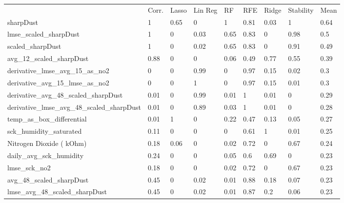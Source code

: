 \begin{table}[]
\centering
\small
\begin{tabular}{lllllllll}
\\
\\
\toprule
     & Corr. & Lasso & Lin Reg & RF   & RFE  & Ridge & Stability & Mean \\
\midrule
sharpDust                                    & 1     & 0.65       & 0    & 1    & 0.81  & 0.03      & 1    & 0.64 \\
lmse\_scaled\_sharpDust                      & 1     & 0          & 0.03 & 0.65 & 0.83  & 0         & 0.98 & 0.5  \\
scaled\_sharpDust                            & 1     & 0          & 0.02 & 0.65 & 0.83  & 0         & 0.91 & 0.49 \\
avg\_12\_scaled\_sharpDust                   & 0.88  & 0          & 0    & 0.06 & 0.49  & 0.77      & 0.55 & 0.39 \\
derivative\_lmse\_avg\_15\_as\_no2           & 0     & 0          & 0.99 & 0    & 0.97  & 0.15      & 0.02 & 0.3  \\
derivative\_avg\_15\_lmse\_as\_no2           & 0     & 0          & 1    & 0    & 0.97  & 0.15      & 0.01 & 0.3  \\
derivative\_avg\_48\_scaled\_sharpDust       & 0.01  & 0          & 0.99 & 0.01 & 1     & 0.01      & 0    & 0.29 \\
derivative\_lmse\_avg\_48\_scaled\_sharpDust & 0.01  & 0          & 0.89 & 0.03 & 1     & 0.01      & 0    & 0.28 \\
temp\_as\_box\_differential                  & 0.01  & 1          & 0    & 0.22 & 0.47  & 0.13      & 0.05 & 0.27 \\
sck\_humidity\_saturated                     & 0.11  & 0          & 0    & 0    & 0.61  & 1         & 0.01 & 0.25 \\
Nitrogen Dioxide ( kOhm)                     & 0.18  & 0.06       & 0    & 0.02 & 0.72  & 0         & 0.67 & 0.24 \\
daily\_avg\_sck\_humidity                    & 0.24  & 0          & 0    & 0.05 & 0.6   & 0.69      & 0    & 0.23 \\
lmse\_sck\_no2                               & 0.18  & 0          & 0    & 0.02 & 0.72  & 0         & 0.67 & 0.23 \\
avg\_48\_scaled\_sharpDust                   & 0.45  & 0          & 0.02 & 0.01 & 0.88  & 0.18      & 0.07 & 0.23 \\
lmse\_avg\_48\_scaled\_sharpDust             & 0.45  & 0          & 0.02 & 0.01 & 0.87  & 0.2       & 0.06 & 0.23 \\

\end{tabular}
\end{table}
